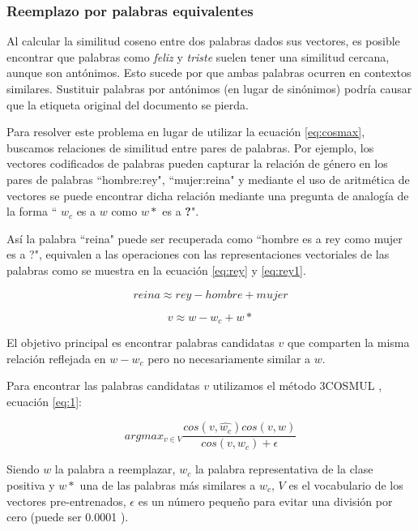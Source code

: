 \subsubsection{Reemplazo por palabras equivalentes}
Al calcular la similitud coseno entre dos palabras dados sus vectores, es posible encontrar que palabras como \textit{feliz} y \textit{triste} suelen tener una similitud cercana, aunque son antónimos. Esto sucede por que ambas palabras ocurren en contextos similares. Sustituir palabras por antónimos (en lugar de sinónimos) podría causar que la etiqueta original del documento se pierda.
 
 Para resolver este problema en lugar de utilizar la ecuación \ref{eq:cosmax}, buscamos relaciones de similitud entre pares de palabras. 
 Por ejemplo, los vectores codificados de palabras pueden capturar la relación de género en los pares de palabras ``hombre:rey", ``mujer:reina"
 y mediante el uso de aritmética de vectores se puede encontrar dicha relación mediante una pregunta de analogía de la forma `` $w_c$ es a $w$ como $w*$ es a \textbf{?}". 
 
 Así la palabra ``reina" puede ser recuperada como ``hombre es a rey como mujer es a ?", equivalen a las operaciones con las representaciones vectoriales de las palabras como se muestra en la ecuación \ref{eq:rey} y \ref{eq:rey1}. 
 
 \begin{equation}
    \label{eq:rey}
     reina \approx  rey-hombre+mujer
 \end{equation}

\begin{equation}
    \label{eq:rey1}
    v \approx w-w_c+w*
\end{equation}
 

 El objetivo principal es encontrar palabras candidatas $v$ que comparten la misma relación reflejada en $w-w_c$ pero no necesariamente similar a $w$. 
 
Para encontrar las palabras candidatas $v$ utilizamos el método 3COSMUL \cite{levy2014linguistic}, ecuación \ref{eq:1}:

\begin{equation} \label{eq:1}
    argmax_{v \in V}\frac{cos(v,\hat{w_c}) cos (v,w)}{cos (v,w_c)+ \epsilon}
\end{equation} 

Siendo $w$ la palabra a reemplazar, $w_c$ la palabra representativa de la clase positiva y $w*$ una de las palabras más similares a $w_c$, $V$ es el vocabulario de los vectores pre-entrenados, $\epsilon$  es un número pequeño para evitar una división por cero (puede ser 0.0001 ).


